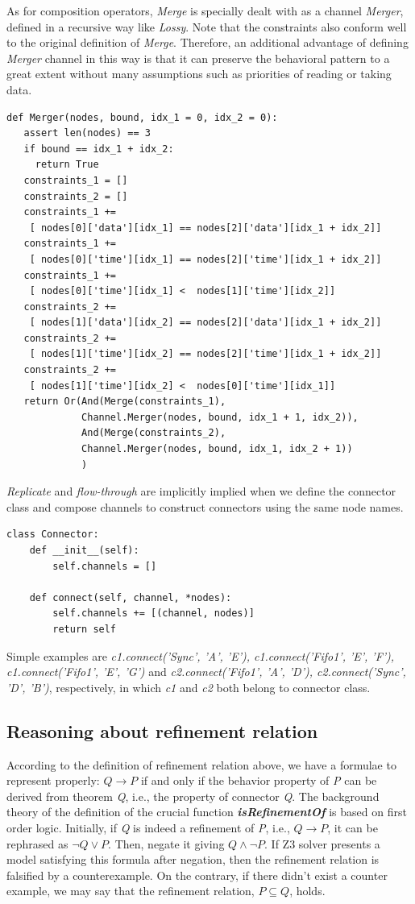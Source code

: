 \documentclass{llncs}
\begin{document}
As for composition operators, \emph{Merge} is specially dealt with as a channel \emph{Merger}, defined in a recursive way like \emph{Lossy}. Note that the constraints also conform well to the original definition of \emph{Merge}. Therefore, an additional advantage of defining \emph{Merger} channel in this way is that it can preserve the behavioral pattern to a great extent without many assumptions such as priorities of reading or taking data.
\begin{verbatim}
def Merger(nodes, bound, idx_1 = 0, idx_2 = 0):
   assert len(nodes) == 3
   if bound == idx_1 + idx_2:
     return True
   constraints_1 = []
   constraints_2 = []
   constraints_1 += 
    [ nodes[0]['data'][idx_1] == nodes[2]['data'][idx_1 + idx_2]]
   constraints_1 += 
    [ nodes[0]['time'][idx_1] == nodes[2]['time'][idx_1 + idx_2]]
   constraints_1 += 
    [ nodes[0]['time'][idx_1] <  nodes[1]['time'][idx_2]]
   constraints_2 += 
    [ nodes[1]['data'][idx_2] == nodes[2]['data'][idx_1 + idx_2]]
   constraints_2 += 
    [ nodes[1]['time'][idx_2] == nodes[2]['time'][idx_1 + idx_2]]
   constraints_2 += 
    [ nodes[1]['time'][idx_2] <  nodes[0]['time'][idx_1]]
   return Or(And(Merge(constraints_1), 
             Channel.Merger(nodes, bound, idx_1 + 1, idx_2)),
             And(Merge(constraints_2), 
             Channel.Merger(nodes, bound, idx_1, idx_2 + 1))
             )
\end{verbatim}
\emph{Replicate} and \emph{flow-through} are implicitly implied when we define the connector class and compose channels to construct connectors using the same node names. 
\begin{verbatim}
class Connector:
    def __init__(self):
        self.channels = []

    def connect(self, channel, *nodes):
        self.channels += [(channel, nodes)]
        return self
\end{verbatim}
Simple examples are \emph{c1.connect('Sync', 'A', 'E'), c1.connect('Fifo1', 'E', 'F'), c1.connect('Fifo1', 'E', 'G')} and \emph{c2.connect('Fifo1', 'A', 'D'), c2.connect('Sync', 'D', 'B')}, respectively, in which \emph{c1} and \emph{c2} both belong to connector class.


\subsection{Reasoning about refinement relation}
According to the definition of refinement relation above, we have a formulae to represent properly: $Q \rightarrow P$ if and only if the behavior property of \emph{P} can be derived from theorem \emph{Q}, i.e., the property of connector \emph{Q}. The background theory of the definition of the crucial function  \textbf{\emph{isRefinementOf}} is based on first order logic. Initially, if \emph{Q} is indeed a refinement of \emph{P}, i.e., $Q \rightarrow P$, it can be rephrased as $\neg Q \vee P$. Then, negate it giving $Q \wedge \neg P$. If Z3 solver presents a model satisfying this formula after negation, then the refinement relation is falsified by a counterexample. On the contrary, if there didn't exist a counter example, we may say that the refinement relation, $P\subseteq Q$, holds.
\end{document}
